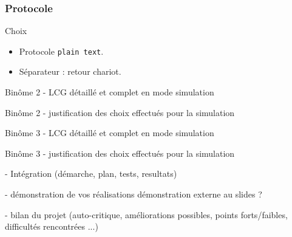 \documentclass{beamer}
\begin{document}

\begin{frame}
\frametitle{Protocole}
    \begin{block}{Choix}
	\begin{itemize}
	    \item Protocole \texttt{plain text}.
	    \item Séparateur : retour chariot.
	\end{itemize}
    \end{block}
\end{frame}

\begin{frame}
Binôme 2
- LCG détaillé et complet en mode simulation
\end{frame}

\begin{frame}
Binôme 2
- justification des choix effectués pour la simulation  
\end{frame}

\begin{frame}
Binôme 3
- LCG détaillé et complet en mode simulation
\end{frame}

\begin{frame}
Binôme 3
- justification des choix effectués pour la simulation 
\end{frame}

\begin{frame}
- Intégration (démarche, plan, tests, resultats)
\end{frame}

\begin{frame}
- démonstration de vos réalisations
démonstration externe au slides ?
\end{frame}

\begin{frame}
- bilan du projet (auto-critique, améliorations possibles, points forts/faibles, difficultés rencontrées ...) 
\end{frame}
\end{document}
